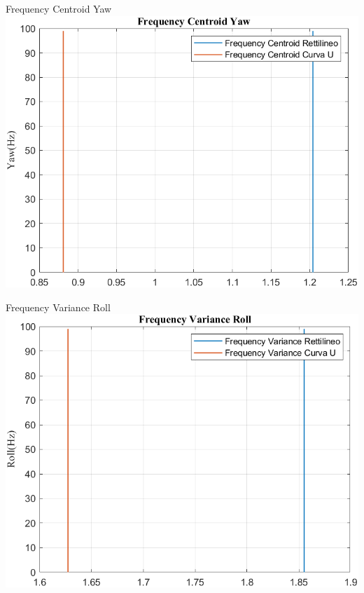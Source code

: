 \documentclass[beamer]{standalone}
\begin{document}
	\begin{frame}{{Frequency Centroid Yaw}}
		\centering\includegraphics[height=.8\textheight]{figure/VAng/Trasformata/Frequency CentroidYaw}
	\end{frame}
	
	\begin{frame}{{Frequency Variance Roll}}
		\centering\includegraphics[height=.8\textheight]{figure/VAng/Trasformata/Frequency VarianceRoll}
	\end{frame}
	
\end{document}
